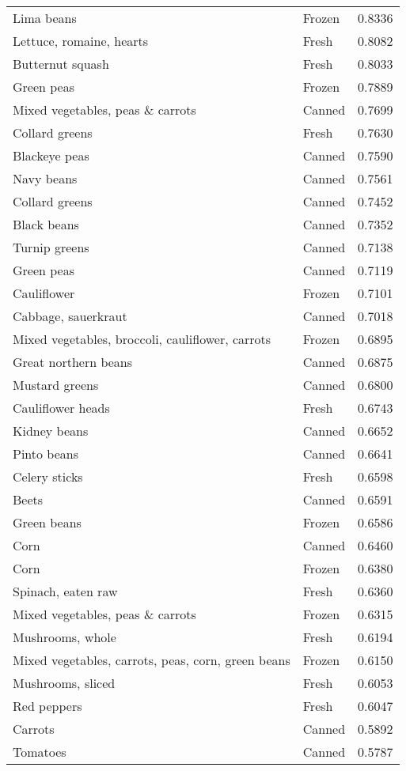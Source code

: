 \documentclass[
]{article}
\begin{document}
\begin{longtable}[t]{llr}
Lima beans & Frozen & 0.8336\\
Lettuce, romaine, hearts & Fresh & 0.8082\\
\addlinespace
Butternut squash & Fresh & 0.8033\\
Green peas & Frozen & 0.7889\\
Mixed vegetables, peas \& carrots & Canned & 0.7699\\
Collard greens & Fresh & 0.7630\\
Blackeye peas & Canned & 0.7590\\
\addlinespace
Navy beans & Canned & 0.7561\\
Collard greens & Canned & 0.7452\\
Black beans & Canned & 0.7352\\
Turnip greens & Canned & 0.7138\\
Green peas & Canned & 0.7119\\
\addlinespace
Cauliflower & Frozen & 0.7101\\
Cabbage, sauerkraut & Canned & 0.7018\\
Mixed vegetables, broccoli, cauliflower, carrots & Frozen & 0.6895\\
Great northern beans & Canned & 0.6875\\
Mustard greens & Canned & 0.6800\\
\addlinespace
Cauliflower heads & Fresh & 0.6743\\
Kidney beans & Canned & 0.6652\\
Pinto beans & Canned & 0.6641\\
Celery sticks & Fresh & 0.6598\\
Beets & Canned & 0.6591\\
\addlinespace
Green beans & Frozen & 0.6586\\
Corn & Canned & 0.6460\\
Corn & Frozen & 0.6380\\
Spinach, eaten raw & Fresh & 0.6360\\
Mixed vegetables, peas \& carrots & Frozen & 0.6315\\
\addlinespace
Mushrooms, whole & Fresh & 0.6194\\
Mixed vegetables, carrots, peas, corn, green beans & Frozen & 0.6150\\
Mushrooms, sliced & Fresh & 0.6053\\
Red peppers & Fresh & 0.6047\\
Carrots & Canned & 0.5892\\
\addlinespace
Tomatoes & Canned & 0.5787\\

\end{longtable}
\end{document}
